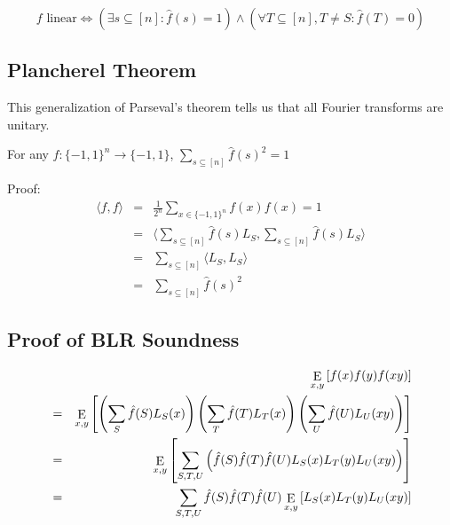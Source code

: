 \documentclass[12pt]{article}
\begin{document}
\begin{fact}
\begin{displaymath}
f \textrm{ linear} \Leftrightarrow \left(
\exists{s \subseteq [n]}: \hat{f}(s) = 1 \right) \land
\left(\forall{T \subseteq [n], T \ne S}: \hat{f}(T) = 0 \right)
\end{displaymath}
\end{fact}

\subsection{Plancherel Theorem}

This generalization of Parseval's theorem tells us that all Fourier transforms
are unitary.

\begin{lemma}
For any $f: \{-1,1\}^n \rightarrow \{-1,1\}$, $\sum_{s \subseteq [n]}{\hat{f}(s)^2 = 1}$

Proof:
\begin{eqnarray*}
\displaystyle \langle f,f \rangle & = & \frac{1}{2^n} \sum_{x \in \{-1,1\}^n}{f(x)f(x)} = 1\\
& = & \langle \sum_{s \subseteq [n]}{\hat{f}(s)L_S},
                            \sum_{s \subseteq [n]}{\hat{f}(s)L_S} \rangle\\
& = & \sum_{s \subseteq [n]}{\langle L_S, L_S \rangle} \\
& = & \sum_{s \subseteq [n]}{\hat{f}(s)^2}
\end{eqnarray*}

\end{lemma}

\subsection{Proof of BLR Soundness}

\begin{eqnarray*}
& &\displaystyle \mathop{\rm {E}}_{x,y}\left[ f(x)f(y)f(xy) \right]\\
& = & \mathop{\rm {E}}_{x,y}\left[ \left(\sum_S{\hat{f}(S)L_S(x)}\right)
                \left(\sum_T{\hat{f}(T)L_T(x)}\right)
                \left(\sum_U{\hat{f}(U)L_U(xy)}\right) \right]\\
& = & \mathop{\rm {E}}_{x,y}\left[ \sum_{S,T,U}{\left(\hat{f}(S)\hat{f}(T)\hat{f}(U)L_S(x) L_T(y) L_U(xy)\right)} \right]\\
& = & \sum_{S,T,U}{\hat{f}(S)\hat{f}(T)\hat{f}(U)} \mathop{\rm {E}}_{x,y}\left[L_S(x)L_T(y)L_U(xy)\right]
\end{eqnarray*}
\end{document}

